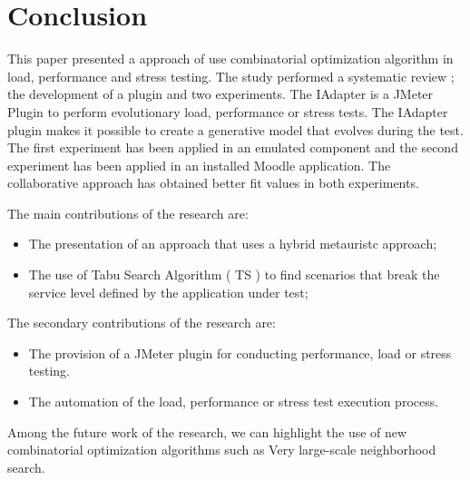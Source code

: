 \section{Conclusion}

This paper presented a approach of use combinatorial optimization algorithm in load, performance and stress testing. The study performed a systematic review ; the development of a plugin and two experiments. The IAdapter is a JMeter Plugin to perform evolutionary load, performance or stress tests. The IAdapter plugin makes it possible to create a generative model that evolves during the test. The first experiment has been applied in an emulated component and the second experiment has been applied in an installed Moodle application.  The collaborative approach has obtained better fit values in both experiments. 

The main contributions of the research are:

\begin{itemize}
\item The presentation of an approach that uses a hybrid metauristc approach;
\item The use of Tabu Search Algorithm ( TS ) to find scenarios that break the  service level defined by the application under test;
\end{itemize}

The secondary contributions of the research are:

\begin{itemize}
\item The provision of a JMeter plugin for conducting performance, load or stress  testing.
\item The automation of the  load, performance or stress test execution process.
\end{itemize}

Among the future work of the research, we can highlight the use of new combinatorial optimization algorithms such as Very large-scale neighborhood search.